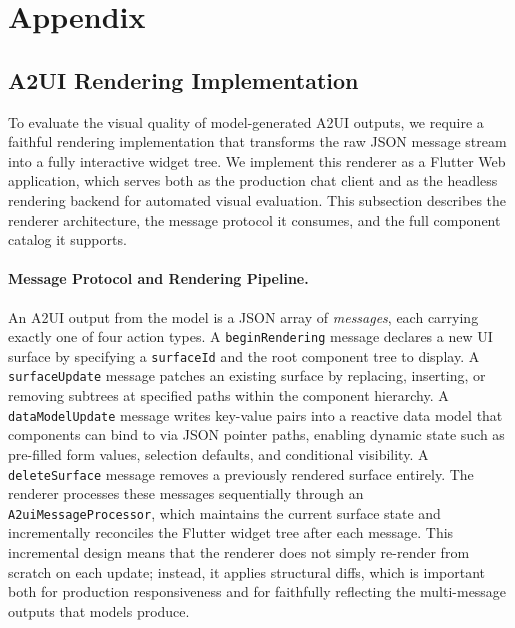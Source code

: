 \documentclass{llmxive}
\begin{document}



\appendix
\section{Appendix}
\subsection{A2UI Rendering Implementation}
\label{appendix:rendering}

To evaluate the visual quality of model-generated A2UI outputs, we require a faithful rendering implementation that transforms the raw JSON message stream into a fully interactive widget tree. We implement this renderer as a Flutter Web application, which serves both as the production chat client and as the headless rendering backend for automated visual evaluation. This subsection describes the renderer architecture, the message protocol it consumes, and the full component catalog it supports.

\paragraph{Message Protocol and Rendering Pipeline.}
An A2UI output from the model is a JSON array of \emph{messages}, each carrying exactly one of four action types. A \texttt{beginRendering} message declares a new UI surface by specifying a \texttt{surfaceId} and the root component tree to display. A \texttt{surfaceUpdate} message patches an existing surface by replacing, inserting, or removing subtrees at specified paths within the component hierarchy. A \texttt{dataModelUpdate} message writes key-value pairs into a reactive data model that components can bind to via JSON pointer paths, enabling dynamic state such as pre-filled form values, selection defaults, and conditional visibility. A \texttt{deleteSurface} message removes a previously rendered surface entirely. The renderer processes these messages sequentially through an \texttt{A2uiMessageProcessor}, which maintains the current surface state and incrementally reconciles the Flutter widget tree after each message. This incremental design means that the renderer does not simply re-render from scratch on each update; instead, it applies structural diffs, which is important both for production responsiveness and for faithfully reflecting the multi-message outputs that models produce.
\end{document}
